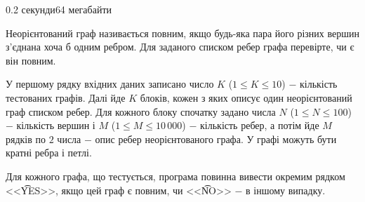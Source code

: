 \begin{problem}{}{}{}{0.2 секунди}{64 мегабайти}

Неорієнтований граф називається повним, якщо будь-яка пара його різних вершин з'єднана хоча б одним ребром. 
Для заданого списком ребер графа перевірте, чи є він повним.

\InputFile
У першому рядку вхідних даних записано число $K$ ($1 \le K \le 10$) $-$ кількість тестованих графів. 
Далі йде $K$ блоків, кожен з яких описує один неорієнтований граф списком ребер. 
Для кожного блоку спочатку задано числа $N$ ($1 \le N \le 100$) $-$ кількість вершин і $M$ ($1 \le M \le 10\,000$) $-$
кількість ребер, а потім йде $M$ рядків по $2$ числа $-$ опис ребер неорієнтованого графа. У графі можуть бути кратні ребра
і петлі.

\OutputFile
Для кожного графа, що тестується, програма повинна вивести окремим рядком <<{\t{YES}}>>, якщо цей граф
є повним, чи <<{\t{NO}}>> $-$ в іншому випадку.

\Example

\begin{example}
%
\end{example}

\end{problem}

